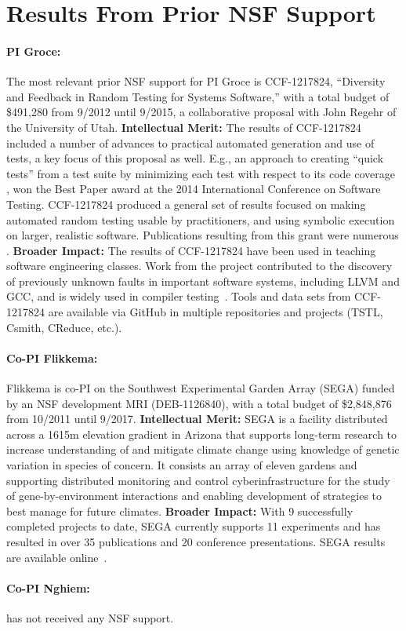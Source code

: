 \section{Results From Prior NSF Support}

\paragraph{PI Groce:}
The most relevant prior NSF support for PI Groce is
CCF-1217824, ``Diversity and Feedback in Random Testing for Systems
Software,'' with a total budget of \$491,280 from 9/2012 until 9/2015,
a collaborative proposal with John Regehr of the University of
Utah. {\bf Intellectual Merit:} The results of CCF-1217824 included a
number of advances to practical automated generation and use of tests,
a key focus of this proposal as well.  E.g., an approach to creating ``quick
tests'' from a test suite by minimizing each
test with respect to its code coverage \cite{icst2014}, won the
Best Paper award at the 2014 International Conference on Software
Testing.  CCF-1217824
produced a general set of results focused on making automated random
testing usable by practitioners, and using symbolic execution on
larger, realistic software.  Publications resulting from this grant
were numerous
\cite{Onward14,PLDI13,issta14,icst2014,helphelp,DirectedSwarm,stvrcausereduce,tstlsttt,ISSTA15,ASEAdeq}. {\bf
  Broader
  Impact:} The results of CCF-1217824 have been used in teaching software
engineering classes.
Work from the project contributed to the discovery of previously
unknown faults in important software
systems, including LLVM and GCC, and is widely used in compiler
testing~\cite{ZhendongPLDI14,beginnerluck,dewey2015fuzzing,le2015randomized}.
Tools and data sets from CCF-1217824 are available via GitHub in
multiple repositories and projects (TSTL, Csmith, CReduce, etc.).

\paragraph{Co-PI Flikkema:} Flikkema is co-PI on the Southwest Experimental Garden Array (SEGA)
funded by an NSF development MRI
(DEB-1126840), with a total budget of \$2,848,876 from 10/2011 until
9/2017. {\bf Intellectual Merit:} SEGA is a facility
distributed across a 1615m elevation gradient in Arizona that supports
long-term research to increase understanding of and mitigate climate
change using knowledge of genetic variation in species of concern. It
consists an array of eleven gardens and supporting distributed
monitoring and control cyberinfrastructure for the study of
gene-by-environment interactions and enabling development of
strategies to best manage for future climates. {\bf Broader
  Impact:}  With 9 successfully completed projects to date, SEGA
currently supports 11 experiments and has resulted in over 35
publications and 20 conference presentations.  SEGA results are
available online~\cite{SEGA}.

\paragraph{Co-PI Nghiem:} has not received any NSF support.
